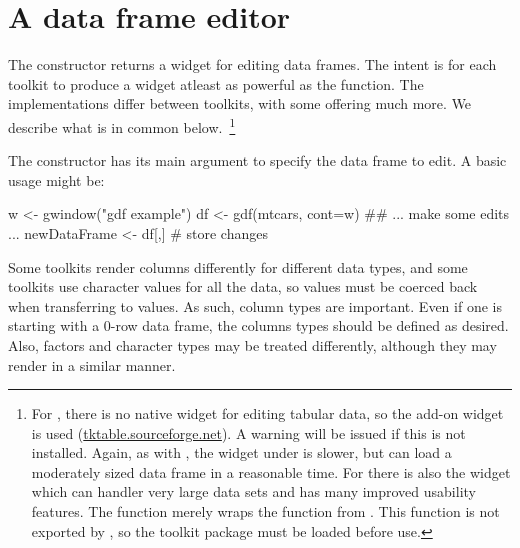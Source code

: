 

\section{A data frame editor}
\label{sec:gWidgets-an-editor-tabular}

The  constructor returns a widget for editing data
frames. The intent is for each toolkit to produce a widget atleast as
powerful as the  function. The implementations
differ between toolkits, with some offering much more. We describe
what is in common below.~\footnote{ For , there is
  no native widget for editing tabular data, so the 
  add-on widget is used (\url{tktable.sourceforge.net}). A warning
  will be issued if this is not installed. Again, as with
  , the widget under  is slower,
  but can load a moderately sized data frame in a reasonable time. For
   there is also the 
  widget which can handler very large data sets and has many improved usability
  features. The  function merely wraps the
   function from . This function
  is not exported by , so the toolkit package must be
  loaded before use. }


The constructor has its main argument  to specify the data
frame to edit. A basic usage might be:

\begin{Schunk}
\begin{Sinput}
 w <- gwindow("gdf example")
 df <- gdf(mtcars, cont=w)
 ## ... make some edits ...
 newDataFrame <- df[,]                   # store changes
\end{Sinput}
\end{Schunk}
%

Some toolkits render columns differently for different data types, and
some toolkits use character values for all the data, so values must be
coerced back when transferring to \R\/ values. As such, column types
are important. Even if one is starting with a $0$-row data frame, the
columns types should be defined as desired. Also, factors and
character types may be treated differently, although they may render
in a similar manner.

